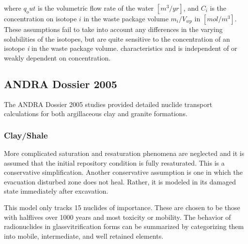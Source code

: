 where $q_out$ is the volumetric flow rate of the water $[m^3/yr]$, and 
$C_i$ is the concentration on isotope $i$ in the waste package volume 
$m_i/V_{wp}$ in $[mol/m^3]$. These assumptions fail to take into account any
differences in the varying solubilities of the isotopes, but are quite
sensitive to the concentration of an isotope \emph{i} in the waste package
volume.  
characteristics and is independent of or weakly dependent on concentration.  

\subsection{ANDRA Dossier 2005} The ANDRA Dossier 2005 studies provided
detailed nuclide transport calculations for both argillaceous clay and granite
formations.

\subsubsection{Clay/Shale} More complicated saturation and resaturation phenomena 
are neglected and it is assumed that the initial repository condition is fully
resaturated. This is a conservative simplification. Another conservative
assumption is one in which the evacuation disturbed zone does not heal. Rather,
it is modeled in its damaged state immediately after excavation. 

This model only tracks 15 nuclides of importance.  These are chosen to be those
with halflives over 1000 years and most toxicity or mobility.
\cite{andra_argile:_2005} The behavior of radionuclides in 
glassvitrification forms can be summarized by categorizing them into mobile,
intermediate, and well retained elements. 






